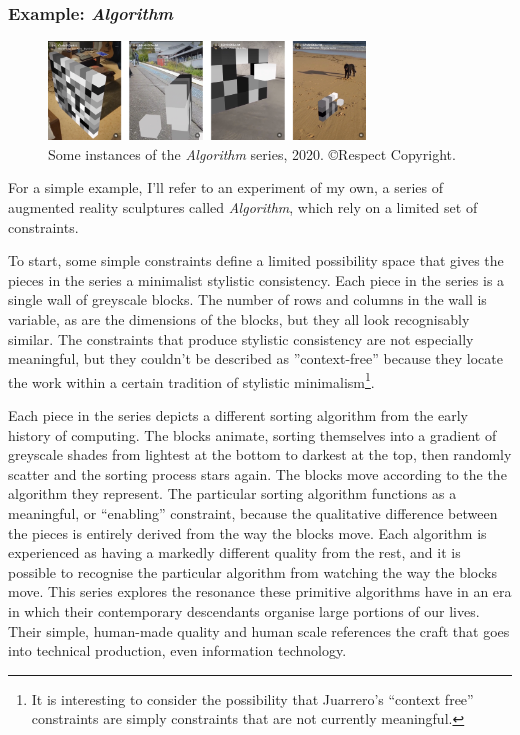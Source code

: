 \documentclass[letterpaper]{article}
\begin{document}
    \subsubsection{Example: \emph{Algorithm}}

    \begin{figure}[h]
    \includegraphics[width=3.31in]{bubble-sort.png}
    \caption{Some instances of the \emph{Algorithm} series, 2020. \copyright Respect Copyright.}
    \end{figure}

    For a simple example, I'll refer to an experiment of my own, a series of augmented reality sculptures called \emph{Algorithm}, which rely on a limited set of constraints.
    
    To start, some simple constraints define a limited possibility space that gives the pieces in the series a minimalist stylistic consistency. Each piece in the series is a single wall of greyscale blocks. The number of rows and columns in the wall is variable, as are the dimensions of the blocks, but they all look recognisably similar. The constraints that produce stylistic consistency are not especially meaningful, but they couldn't be described as ”context-free” because they locate the work within a certain tradition of stylistic minimalism\footnote{
        It is interesting to consider the possibility that Juarrero's “context free” constraints are simply constraints that are not currently meaningful.
    }.
    
    Each piece in the series depicts a different sorting algorithm from the early history of computing. The blocks animate, sorting themselves into a gradient of greyscale shades from lightest at the bottom to darkest at the top, then randomly scatter and the sorting process stars again. The blocks move according to the the algorithm they represent. The particular sorting algorithm functions as a meaningful, or “enabling” constraint, because the qualitative difference between the pieces is entirely derived from the way the blocks move. Each algorithm is experienced as having a markedly different quality from the rest, and it is possible to recognise the particular algorithm from watching the way the blocks move. This series explores the resonance these primitive algorithms have in an era in which their contemporary descendants organise large portions of our lives. Their simple, human-made quality and human scale references the craft that goes into technical production, even information technology.
\end{document}
